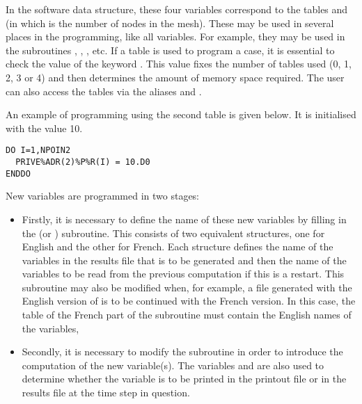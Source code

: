 In the software data structure, these four variables correspond to the tables
and  (in which  is the number of
nodes in the mesh).
These may be used in several places in the programming, like all \tel variables.
For example, they may be used in the subroutines ,
, , etc.
If a  table is used to program a case, it is essential
to check the value of the keyword .
This value fixes the number of tables used (0, 1, 2, 3 or 4)
and then determines the amount of memory space required.
The user can also access the tables via the aliases
 and .

An example of programming using the second  table is given below.
It is initialised with the value 10.

\begin{lstlisting}[language=TelFortran]
DO I=1,NPOIN2
  PRIVE%ADR(2)%P%R(I) = 10.D0
ENDDO
\end{lstlisting}

New variables are programmed in two stages:

\begin{itemize}
\item Firstly, it is necessary to define the name of these new variables
by filling in the  (or )
subroutine.
This consists of two equivalent structures, one for English and the other
for French.
Each structure defines the name of the variables in the results file
that is to be generated and then the name of the variables to be read
from the previous computation if this is a restart.
This subroutine may also be modified when, for example, a file generated with
the English version of  is to be continued with the French version.
In this case, the  table of the French part of the subroutine
must contain the English names of the variables,

\item Secondly, it is necessary to modify the 
subroutine in order to introduce the computation of the new variable(s).
The variables  and  are also used to
determine whether the variable is to be printed in the printout file
or in the results file at the time step in question.
\end{itemize}

